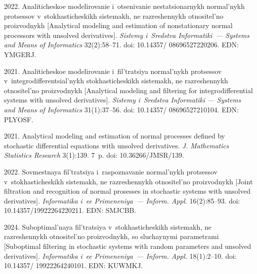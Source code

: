   \begin{multicols}{2}

\renewcommand{\bibname}{\protect\rmfamily References}

{\small\frenchspacing
 {\baselineskip=11.8pt
 \begin{thebibliography}{99} 
 2022. 
Analiticheskoe modelirovanie i~otsenivanie nestatsionarnykh normal'nykh protsessov v~stokhasticheskikh sistemakh, 
ne razreshennykh otnositel'no proizvodnykh [Analytical modeling and estimation of nonstationary normal processors with unsolved derivatives]. 
\textit{Sistemy i~Sredstva Informatiki~--- Systems and Means of Informatics} 32(2):58--71. doi: 10.14357/ 08696527220206. EDN: YMGERJ.

 2021. 
Analiticheskoe modelirovanie i~fil'tratsiya normal'nykh protsessov v~integ\-ro\-dif\-fe\-ren\-tsi\-al'\-nykh stokhasticheskikh sistemakh, 
ne razreshennykh otnositel'no proizvodnykh 
[Analytical modeling and filtering for integrodifferential systems with unsolved derivatives]. 
\textit{Sistemy i~Sredstva Informatiki --- Systems and Means of Informatics} 31(1):37--56.
doi: 10.14357/ 08696527210104. EDN: PLYOSF.

 2021. 
Analytical modeling and estimation of normal processes defined by stochastic differential equations with unsolved derivatives. 
\textit{J. Mathematics Statistics Research} 3(1):139. 7~p. doi: 10.36266/JMSR/139.

 2022. 
Sovmestnaya fil'tratsiya i~ras\-po\-zna\-va\-nie normal'nykh protsessov v~stokhasticheskikh sistemakh, ne razreshennykh otnositel'no proizvodnykh 
[Joint filtration and recognition of normal prosesses in stochastic systems with unsolved derivatives]. 
\textit{Informatika i~ee Primeneniya~--- Inform. Appl.} 16(2):85--93. 
doi: 10.14357/19922264220211. EDN: SMJCBB.

 2024. 
Suboptimal'naya fil'tratsiya v~stokhasticheskikh sistemakh, ne razreshennykh otnositel'no proizvodnykh, so sluchaynymi pa\-ra\-met\-ra\-mi 
[Suboptimal filtering in stochastic systems with random parameters and unsolved derivatives].
\textit{Informatika i~ee Primeneniya~--- Inform. Appl.} 18(1):2--10.
doi: 10.14357/ 19922264240101. EDN: KUWMKJ.


\end{thebibliography}}}
\end{multicols}
